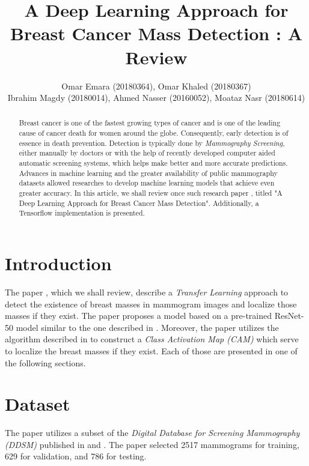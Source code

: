 \documentclass[twocolumn]{article}
\title{A Deep Learning Approach for Breast Cancer Mass Detection : A Review}
\author{
  Omar Emara (20180364), Omar Khaled (20180367) \\
  Ibrahim Magdy (20180014), Ahmed Nasser (20160052), Moataz Nasr (20180614)
}
\begin{document}
\maketitle

\begin{abstract}

  Breast cancer is one of the fastest growing types of cancer and is one of the
  leading cause of cancer death for women around the globe. Consequently, early
  detection is of essence in death prevention. Detection is typically done by
  \emph{Mammography Screening}, either manually by doctors or with the help of
  recently developed computer aided automatic screening systems, which helps
  make better and more accurate predictions. Advances in machine learning and
  the greater availability of public mammography datasets allowed researches to
  develop machine learning models that achieve even greater accuracy. In this
  article, we shall review once such research paper \autocite{Fathy2019}, titled
  "A Deep Learning Approach for Breast Cancer Mass Detection". Additionally, a
  Tensorflow implementation is presented.

\end{abstract}

\section{Introduction}

The paper \autocite{Fathy2019}, which we shall review, describe a \emph{Transfer
Learning} approach to detect the existence of breast masses in mammogram images
and localize those masses if they exist. The paper proposes a model based on a
pre-trained ResNet-50 model similar to the one described in \autocite{He2016}.
Moreover, the paper utilizes the algorithm described in \autocite{Zhou2016} to
construct a \emph{Class Activation Map (CAM)} which serve to localize the breast
masses if they exist. Each of those are presented in one of the following
sections.

\section{Dataset}

The paper utilizes a subset of the \emph{Digital Database for Screening
Mammography (DDSM)} published in \autocite{Bowyer1996} and \autocite{Heath1998}.
The paper selected 2517 mammograms for training, 629 for validation, and 786 for
testing.
\end{document}
